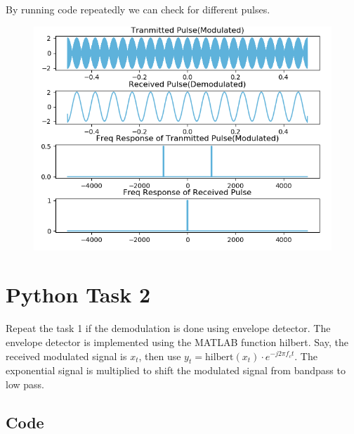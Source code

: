 \documentclass[
	12pt, 
]{fphw_assignment_toc}
\begin{document}
By running code repeatedly we can check for different pulses.

\begin{figure}[ht!]
 \centering
 \includegraphics[scale=0.7]{../Task1.png}
\end{figure}


\newpage
\section{Python Task 2}
\begin{problem}
Repeat the task 1 if the demodulation is done using envelope detector. The envelope detector is implemented using the MATLAB function hilbert. Say, the received modulated signal is $x_t$, then use $y_t = \text{hilbert}(x_t)\cdot e^{-j 2\pi f_c t}$. The exponential signal is multiplied to shift the modulated signal from bandpass to low pass.
\end{problem}
\subsection{Code}
\end{document}
